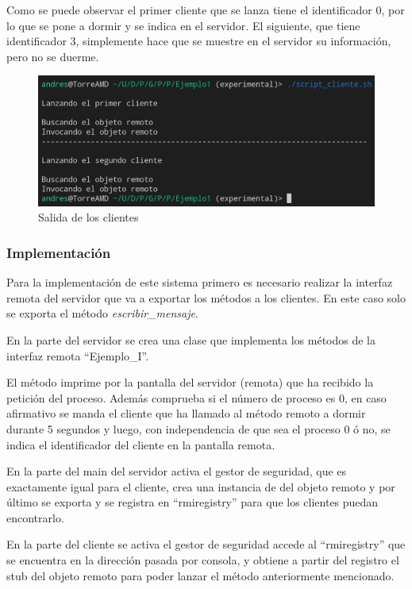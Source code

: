 \documentclass{article}
\begin{document}
Como se puede observar el primer cliente que se lanza tiene el identificador 0, por lo que se pone a dormir y se indica en el servidor. El siguiente, que tiene identificador 3, simplemente hace que se muestre en el servidor su información, pero no se duerme.

\begin{figure}[H]
    \includegraphics[width=\textwidth]{imagenes/E1C.png}
    \caption{Salida de los clientes}
\end{figure}

\subsubsection{Implementación}
Para la implementación de este sistema primero es necesario realizar la interfaz remota del servidor que va a exportar los métodos a los clientes. En este caso solo se exporta el método \textit{escribir\_mensaje}.

En la parte del servidor se crea una clase que implementa los métodos de la interfaz remota ``Ejemplo\_I''.

El método imprime por la pantalla del servidor (remota) que ha recibido la petición del proceso. Además comprueba si el número de proceso es 0, en caso afirmativo se manda el cliente que ha llamado al método remoto a dormir durante 5 segundos y luego, con independencia de que sea el proceso 0 ó no, se indica el identificador del cliente en la pantalla remota.

En la parte del main del servidor activa el gestor de seguridad, que es exactamente igual para el cliente, crea una instancia de del objeto remoto y por último se exporta y se registra en ``rmiregistry'' para que los clientes puedan encontrarlo.

En la parte del cliente se activa el gestor de seguridad accede al ``rmiregistry'' que se encuentra en la dirección pasada por consola, y obtiene a partir del registro el stub del objeto remoto para poder lanzar el método anteriormente mencionado.
\end{document}
